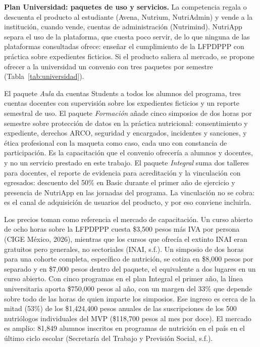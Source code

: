 \documentclass[12pt, a4paper]{article}
\begin{document}
\textbf{Plan Universidad: paquetes de uso y servicios.} La competencia
regala o descuenta el producto al estudiante (Avena, Nutrium,
NutriAdmin) y vende a la institución, cuando vende, cuentas de
administración (Nutrimind). NutriApp separa el uso de la plataforma, que
cuesta poco servir, de lo que ninguna de las plataformas consultadas
ofrece: enseñar el cumplimiento de la LFPDPPP con práctica sobre
expedientes ficticios. Si el producto saliera al mercado, se propone
ofrecer a la universidad un convenio con tres paquetes por semestre
(Tabla~\ref{tab:universidad}).

El paquete \textit{Aula} da cuentas Students a todos los alumnos del
programa, tres cuentas docentes con supervisión sobre los expedientes
ficticios y un reporte semestral de uso. El paquete \textit{Formación}
añade cinco simposios de dos horas por semestre sobre protección de
datos en la práctica nutricional: consentimiento y expediente, derechos
ARCO, seguridad y encargados, incidentes y sanciones, y ética
profesional con la maqueta como caso, cada uno con constancia de
participación. Es la capacitación que el convenio ofrecería a alumnos y
docentes, y no un servicio prestado en este trabajo. El paquete
\textit{Integral} suma dos talleres para docentes, el reporte de
evidencia para acreditación y la vinculación con egresados: descuento
del 50\% en Basic durante el primer año de ejercicio y presencia de
NutriApp en las jornadas del programa. La vinculación no se cobra: es el
canal de adquisición de usuarios del producto, y por eso conviene
incluirla.
 
Los precios toman como referencia el mercado de capacitación. Un curso
abierto de ocho horas sobre la LFPDPPP cuesta \$3,500 pesos más IVA por
persona (CIGE México, 2026), mientras que los cursos que ofrecía el
extinto INAI eran gratuitos pero generales, no sectoriales (INAI,
s.f.). Un simposio de dos horas para una cohorte
completa, específico de nutrición, se cotiza en \$8,000 pesos por
separado y en \$7,000 pesos dentro del paquete, el equivalente a dos
lugares en un curso abierto. Con cinco programas en el plan Integral el
primer año, la línea universitaria aporta \$750,000 pesos al año, con un
margen del 33\% que depende sobre todo de las horas de quien imparte los
simposios. Ese ingreso es cerca de la mitad (53\%) de los \$1,424,400
pesos anuales de las suscripciones de los 500 nutriólogos individuales
del MVP (\$118,700 pesos al mes por doce). El mercado es amplio: 81,849
alumnos inscritos en programas de nutrición en el país en el último
ciclo escolar (Secretaría del Trabajo y Previsión Social, s.f.).
 
\end{document}
